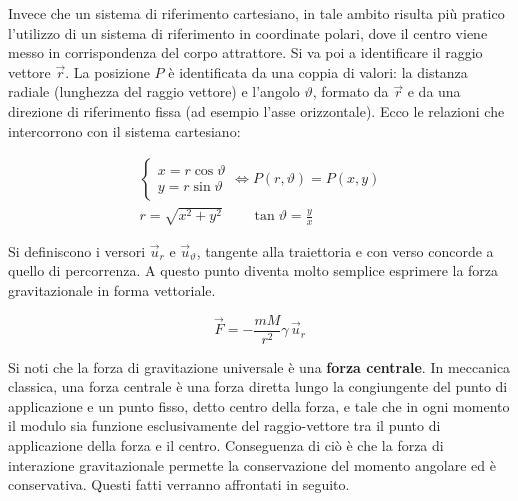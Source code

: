 \begin{figure}[htpb]
\end{figure}
\FloatBarrier
Invece che un sistema di riferimento cartesiano, in tale ambito risulta più pratico l'utilizzo di un sistema di riferimento in coordinate polari, dove il centro viene messo in corrispondenza del corpo attrattore. Si va poi a identificare il raggio vettore $\vec{r}$.  La posizione $P$ è identificata da una coppia di valori: la distanza radiale (lunghezza del raggio vettore) e l'angolo $\vartheta$, formato da $\vec{r}$ e da una direzione di riferimento fissa (ad esempio l'asse orizzontale). Ecco le relazioni che intercorrono con il sistema cartesiano:

\begin{gather*}
	\begin{cases} x=r\cos\vartheta \\ y=r\sin\vartheta \end{cases} \iff P(r,\vartheta)=P(x,y) \\
	r=\sqrt{x^2+y^2} \qquad \tan\vartheta=\frac{y}{x}
\end{gather*}

Si definiscono i versori $\vec{u}_r$ e $\vec{u}_\vartheta$, tangente alla traiettoria e con verso concorde a quello di percorrenza. A questo punto diventa molto semplice esprimere la forza gravitazionale in forma vettoriale.

\[
	\boxed{\vec{F}=-\frac{mM}{r^2}\gamma\, \vec{u}_r}
\]

Si noti che la forza di gravitazione universale è una \textbf{forza centrale}. In meccanica classica, una forza centrale è una forza diretta lungo la congiungente del punto di applicazione e un punto fisso, detto centro della forza, e tale che in ogni momento il modulo sia funzione esclusivamente del raggio-vettore tra il punto di applicazione della forza e il centro. Conseguenza di ciò è che la forza di interazione gravitazionale permette la conservazione del momento angolare ed è conservativa. Questi fatti verranno affrontati in seguito.


